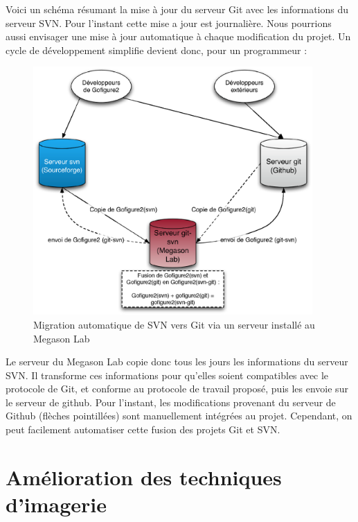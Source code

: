 Voici un schéma résumant la mise à jour du serveur Git avec les informations du serveur SVN.
Pour l'instant cette mise a jour est journalière.
Nous pourrions aussi envisager une mise à jour automatique à chaque modification du projet.
Un cycle de développement simplifie devient donc, pour un programmeur :
\begin{figure}[H]
\begin{center}
\leavevmode
\includegraphics[width=0.95\textwidth]{pictures/GitTransfert}
\end{center}
\caption{Migration automatique de SVN vers Git via un serveur installé au Megason Lab}
\label{fig:MigrationGit}
\end{figure}
Le serveur du Megason Lab copie donc tous les jours les informations du serveur SVN.
Il transforme ces informations pour qu'elles soient compatibles avec le protocole de Git,
et conforme au protocole de travail proposé, puis les envoie sur le serveur de github.
Pour l'instant, les modifications provenant du serveur de Github (flèches pointillées)
sont manuellement intégrées au projet. Cependant, on peut facilement automatiser cette fusion des projets Git et SVN.






\section{Amélioration des techniques d'imagerie}

